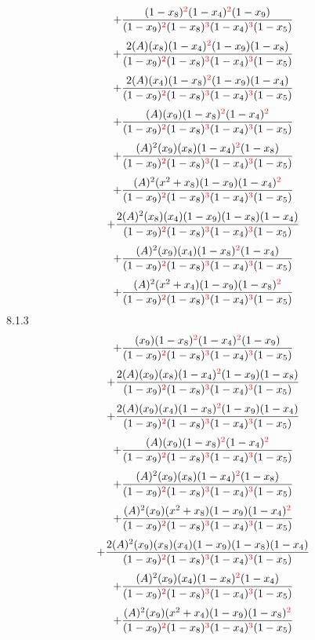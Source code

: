 \documentclass{article}
\begin{document}
\[+\frac{(1-x_8)^{\textcolor{red}{2}}(1-x_4)^{\textcolor{red}{2}}(1-x_9)}{(1-x_9)^{\textcolor{red}{2}}(1-x_8)^{\textcolor{red}{3}}(1-x_4)^{\textcolor{red}{3}}(1-x_5)}\]\[+\frac{2(A)(x_8)(1-x_4)^{\textcolor{red}{2}}(1-x_9)(1-x_8)}{(1-x_9)^{\textcolor{red}{2}}(1-x_8)^{\textcolor{red}{3}}(1-x_4)^{\textcolor{red}{3}}(1-x_5)}\]\[+\frac{2(A)(x_4)(1-x_8)^{\textcolor{red}{2}}(1-x_9)(1-x_4)}{(1-x_9)^{\textcolor{red}{2}}(1-x_8)^{\textcolor{red}{3}}(1-x_4)^{\textcolor{red}{3}}(1-x_5)}\]\[+\frac{(A)(x_9)(1-x_8)^{\textcolor{red}{2}}(1-x_4)^{\textcolor{red}{2}}}{(1-x_9)^{\textcolor{red}{2}}(1-x_8)^{\textcolor{red}{3}}(1-x_4)^{\textcolor{red}{3}}(1-x_5)}\]\[+\frac{(A)^{2}(x_9)(x_8)(1-x_4)^{\textcolor{red}{2}}(1-x_8)}{(1-x_9)^{\textcolor{red}{2}}(1-x_8)^{\textcolor{red}{3}}(1-x_4)^{\textcolor{red}{3}}(1-x_5)}\]\[+\frac{(A)^{2}(x^{2}+x_8)(1-x_9)(1-x_4)^{\textcolor{red}{2}}}{(1-x_9)^{\textcolor{red}{2}}(1-x_8)^{\textcolor{red}{3}}(1-x_4)^{\textcolor{red}{3}}(1-x_5)}\]\[+\frac{2(A)^{2}(x_8)(x_4)(1-x_9)(1-x_8)(1-x_4)}{(1-x_9)^{\textcolor{red}{2}}(1-x_8)^{\textcolor{red}{3}}(1-x_4)^{\textcolor{red}{3}}(1-x_5)}\]\[+\frac{(A)^{2}(x_9)(x_4)(1-x_8)^{\textcolor{red}{2}}(1-x_4)}{(1-x_9)^{\textcolor{red}{2}}(1-x_8)^{\textcolor{red}{3}}(1-x_4)^{\textcolor{red}{3}}(1-x_5)}\]\[+\frac{(A)^{2}(x^{2}+x_4)(1-x_9)(1-x_8)^{\textcolor{red}{2}}}{(1-x_9)^{\textcolor{red}{2}}(1-x_8)^{\textcolor{red}{3}}(1-x_4)^{\textcolor{red}{3}}(1-x_5)}\]
8.1.3
\[+\frac{(x_9)(1-x_8)^{\textcolor{red}{2}}(1-x_4)^{\textcolor{red}{2}}(1-x_9)}{(1-x_9)^{\textcolor{red}{2}}(1-x_8)^{\textcolor{red}{3}}(1-x_4)^{\textcolor{red}{3}}(1-x_5)}\]\[+\frac{2(A)(x_9)(x_8)(1-x_4)^{\textcolor{red}{2}}(1-x_9)(1-x_8)}{(1-x_9)^{\textcolor{red}{2}}(1-x_8)^{\textcolor{red}{3}}(1-x_4)^{\textcolor{red}{3}}(1-x_5)}\]\[+\frac{2(A)(x_9)(x_4)(1-x_8)^{\textcolor{red}{2}}(1-x_9)(1-x_4)}{(1-x_9)^{\textcolor{red}{2}}(1-x_8)^{\textcolor{red}{3}}(1-x_4)^{\textcolor{red}{3}}(1-x_5)}\]\[+\frac{(A)(x_9)(1-x_8)^{\textcolor{red}{2}}(1-x_4)^{\textcolor{red}{2}}}{(1-x_9)^{\textcolor{red}{2}}(1-x_8)^{\textcolor{red}{3}}(1-x_4)^{\textcolor{red}{3}}(1-x_5)}\]\[+\frac{(A)^{2}(x_9)(x_8)(1-x_4)^{\textcolor{red}{2}}(1-x_8)}{(1-x_9)^{\textcolor{red}{2}}(1-x_8)^{\textcolor{red}{3}}(1-x_4)^{\textcolor{red}{3}}(1-x_5)}\]\[+\frac{(A)^{2}(x_9)(x^{2}+x_8)(1-x_9)(1-x_4)^{\textcolor{red}{2}}}{(1-x_9)^{\textcolor{red}{2}}(1-x_8)^{\textcolor{red}{3}}(1-x_4)^{\textcolor{red}{3}}(1-x_5)}\]\[+\frac{2(A)^{2}(x_9)(x_8)(x_4)(1-x_9)(1-x_8)(1-x_4)}{(1-x_9)^{\textcolor{red}{2}}(1-x_8)^{\textcolor{red}{3}}(1-x_4)^{\textcolor{red}{3}}(1-x_5)}\]\[+\frac{(A)^{2}(x_9)(x_4)(1-x_8)^{\textcolor{red}{2}}(1-x_4)}{(1-x_9)^{\textcolor{red}{2}}(1-x_8)^{\textcolor{red}{3}}(1-x_4)^{\textcolor{red}{3}}(1-x_5)}\]\[+\frac{(A)^{2}(x_9)(x^{2}+x_4)(1-x_9)(1-x_8)^{\textcolor{red}{2}}}{(1-x_9)^{\textcolor{red}{2}}(1-x_8)^{\textcolor{red}{3}}(1-x_4)^{\textcolor{red}{3}}(1-x_5)}\]
\end{document}

